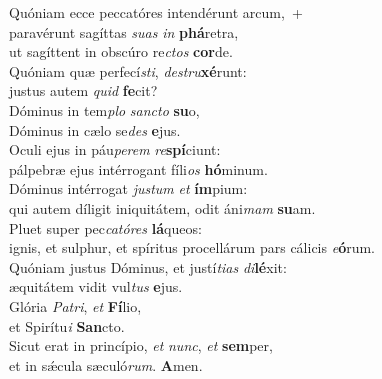 \evenverse Quóniam ecce peccatóres intendérunt arcum,~+\\\evenverse  paravérunt sagíttas \textit{su}\textit{as} \textit{in} \textbf{phá}retra,~\*\\
\evenverse ut sagíttent in obscúro re\textit{ctos} \textbf{cor}de.\\
\oddverse Quóniam quæ perfecí\textit{sti}, \textit{de}\textit{stru}\textbf{xé}runt:~\*\\
\oddverse justus autem \textit{quid} \textbf{fe}cit?\\
\evenverse Dóminus in tem\textit{plo} \textit{san}\textit{cto} \textbf{su}o,~\*\\
\evenverse Dóminus in cælo se\textit{des} \textbf{e}jus.\\
\oddverse Oculi ejus in páu\textit{pe}\textit{rem} \textit{re}\textbf{spí}ciunt:~\*\\
\oddverse pálpebræ ejus intérrogant fíli\textit{os} \textbf{hó}minum.\\
\evenverse Dóminus intérrogat \textit{ju}\textit{stum} \textit{et} \textbf{ím}pium:~\*\\
\evenverse qui autem díligit iniquitátem, odit áni\textit{mam} \textbf{su}am.\\
\oddverse Pluet super pec\textit{ca}\textit{tó}\textit{res} \textbf{lá}queos:~\*\\
\oddverse ignis, et sulphur, et spíritus procellárum pars cálicis \textit{e}\textbf{ó}rum.\\
\evenverse Quóniam justus Dóminus, et justí\textit{ti}\textit{as} \textit{di}\textbf{lé}xit:~\*\\
\evenverse æquitátem vidit vul\textit{tus} \textbf{e}jus.\\
\oddverse Glória \textit{Pa}\textit{tri}, \textit{et} \textbf{Fí}lio,~\*\\
\oddverse et Spirítu\textit{i} \textbf{San}cto.\\
\evenverse Sicut erat in princípio, \textit{et} \textit{nunc}, \textit{et} \textbf{sem}per,~\*\\
\evenverse et in sǽcula sæculó\textit{rum}. \textbf{A}men.\\
